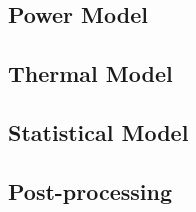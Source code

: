 \subsection{Power Model} 


\subsection{Thermal Model} 


\subsection{Statistical Model} 


\subsection{Post-processing} 

